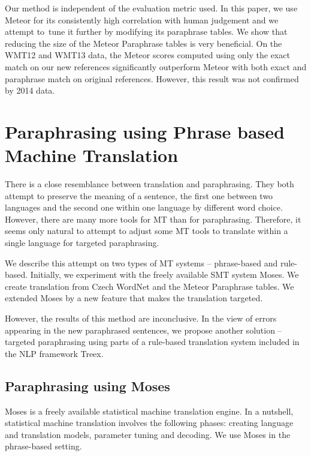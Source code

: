 \documentclass[11pt]{article}
\begin{document}
Our method is independent of the evaluation metric used. In this paper, we use Meteor for its consistently 
high correlation with human judgement and we attempt to~tune it further by modifying its paraphrase tables. 
We show that reducing the size of the Meteor Paraphrase tables is very beneficial. On the WMT12 and WMT13 data,
the Meteor scores computed using only the exact match on our new references significantly outperform Meteor 
with both exact and paraphrase match on original references. However, this result was not confirmed by 2014 
data. %



\section{Paraphrasing using Phrase based Machine Translation}
There is a close resemblance between translation and paraphrasing. They both 
attempt to preserve the meaning of a sentence, the first one between two languages 
and the second one within one language by different word choice. \cite{madnani:2010} 
However, there are many more tools for MT than for paraphrasing. Therefore, it 
seems only natural to attempt to adjust some MT tools to translate within a 
single language for targeted paraphrasing. 

We describe this attempt on two types of MT systems -- phrase-based and rule-based. 
Initially, we experiment with the freely available SMT system Moses.\cite{moses} We 
create translation from Czech WordNet and the Meteor Paraphrase tables. We extended
Moses by a new feature that makes the translation targeted. 

However, the results of this method are inconclusive. In the view of errors appearing 
in the new paraphrased sentences, we propose another solution -- targeted paraphrasing 
using parts of a rule-based translation system included in the NLP framework Treex.


\subsection{Paraphrasing using Moses}
Moses  is a freely available statistical machine translation engine. In a nutshell, 
statistical machine translation involves the following phases: creating language and 
translation models, parameter tuning and decoding. We use Moses in the phrase-based 
setting.
\end{document}
